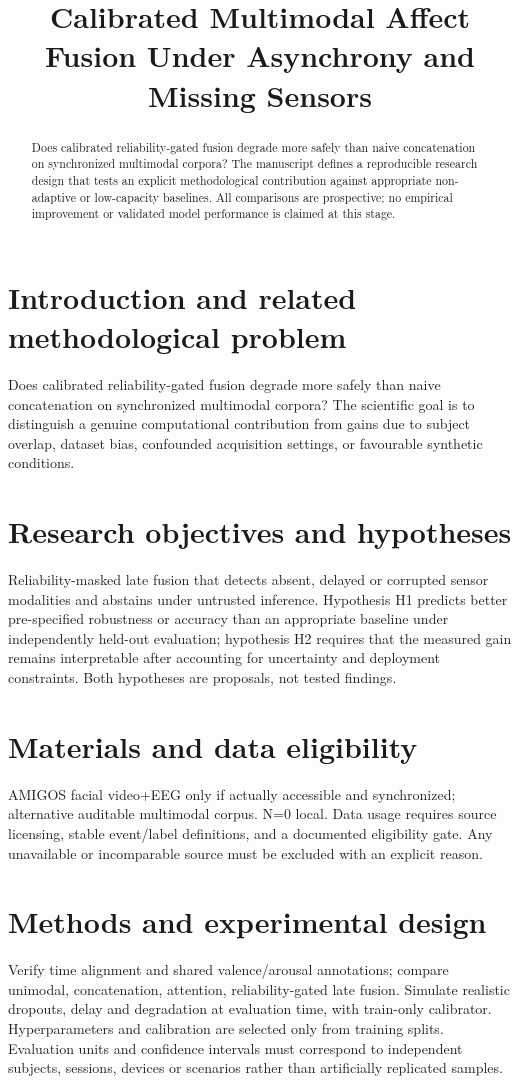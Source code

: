 \documentclass[11pt,a4paper]{article}
\title{Calibrated Multimodal Affect Fusion Under Asynchrony and Missing Sensors}
\author{}
\date{}
\begin{document}
\maketitle
\begin{abstract}
Does calibrated reliability-gated fusion degrade more safely than naive concatenation on synchronized multimodal corpora? The manuscript defines a reproducible research design that tests an explicit methodological contribution against appropriate non-adaptive or low-capacity baselines. All comparisons are prospective; no empirical improvement or validated model performance is claimed at this stage.
\end{abstract}
\section{Introduction and related methodological problem}
Does calibrated reliability-gated fusion degrade more safely than naive concatenation on synchronized multimodal corpora? The scientific goal is to distinguish a genuine computational contribution from gains due to subject overlap, dataset bias, confounded acquisition settings, or favourable synthetic conditions.
\section{Research objectives and hypotheses}
Reliability-masked late fusion that detects absent, delayed or corrupted sensor modalities and abstains under untrusted inference. Hypothesis H1 predicts better pre-specified robustness or accuracy than an appropriate baseline under independently held-out evaluation; hypothesis H2 requires that the measured gain remains interpretable after accounting for uncertainty and deployment constraints. Both hypotheses are proposals, not tested findings.
\section{Materials and data eligibility}
AMIGOS facial video+EEG only if actually accessible and synchronized; alternative auditable multimodal corpus. N=0 local. Data usage requires source licensing, stable event/label definitions, and a documented eligibility gate. Any unavailable or incomparable source must be excluded with an explicit reason.
\section{Methods and experimental design}
Verify time alignment and shared valence/arousal annotations; compare unimodal, concatenation, attention, reliability-gated late fusion. Simulate realistic dropouts, delay and degradation at evaluation time, with train-only calibrator. Hyperparameters and calibration are selected only from training splits. Evaluation units and confidence intervals must correspond to independent subjects, sessions, devices or scenarios rather than artificially replicated samples.
\end{document}
